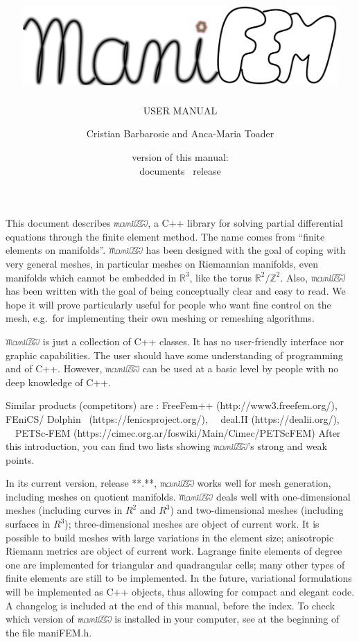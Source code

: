 \documentclass[a4paper]{scrreprt}
\title{\includegraphics[width=12cm]{manifem-grey-capital.eps}}
\subtitle{USER MANUAL}
\author{Cristian Barbarosie and Anca-Maria Toader}
\date{\small version of this manual: \manualversion\\ documents \maniFEM\ release \manifemrelease}
\def\manifemrelease{**.**}
\newcommand\ManiFEM{\leavevmode\hbox{\includegraphics[width=13mm]{manifem-large}}}
\newcommand\maniFEM{\leavevmode\hbox{\includegraphics[width=13mm]{manifem-small}}}
\renewcommand\tt{\normalfont\ttfamily}
\begin{document}
\begin{titlepage}
\maketitle
\end{titlepage}


\chapter*{}

This document describes \maniFEM, a {\tt C++} library for solving partial differential equations
through the finite element method.
The name comes from ``finite elements on manifolds''. 
{\ManiFEM} has been designed with the goal of coping with very general meshes,
in particular meshes on Riemannian manifolds, even manifolds which cannot be embedded
in $ {\mathbb R}^3 $, like the torus $ {\mathbb R}^2/{\mathbb Z}^2 $.
Also, {\maniFEM} has been written with the goal of being conceptually clear
and easy to read.
We hope it will prove particularly useful for people who want fine control on the mesh,
e.g.\ for implementing their own meshing or remeshing algorithms.

{\ManiFEM} is just a collection of {\tt C++} classes.
It has no user-friendly interface nor graphic capabilities.
The user should have some understanding of programming and of {\tt C++}.
However, {\maniFEM} can be used at a basic level by people with no deep knowledge of
{\tt C++}.

Similar products (competitors) are : FreeFem++ ({\small\tt http://www3.freefem.org/}),
FEniCS/ Dolphin \ ({\small\tt https://fenicsproject.org/}),
\ \ deal.II ({\small\tt https://dealii.org/}), \ \ PETSc-FEM\break
({\small\tt https://cimec.org.ar/foswiki/Main/Cimec/PETScFEM})
After this introduction, you can find two lists showing {\maniFEM}'s strong and weak points.

In its current version, release \manifemrelease, {\maniFEM} works well for mesh generation,
including meshes on quotient manifolds.
{\ManiFEM} deals well with one-dimensional meshes (including curves in $ R^2 $ and $ R^3 $)
and two-dimensional meshes (including surfaces in $ R^3 $);
three-dimensional meshes are object of current work.
It is possible to build meshes with large variations in the element size;
anisotropic Riemann metrics are object of current work.
Lagrange finite elements of degree one are implemented for triangular and quadrangular cells;
many other types of finite elements are still to be implemented.
In the future, variational formulations will be implemented as C++ objects,
thus allowing for compact and elegant code.
A changelog is included at the end of this manual, before the index.
To check which version of {\maniFEM} is installed in your computer,
see at the beginning of the file {\small\tt maniFEM.h}.
\end{document}
